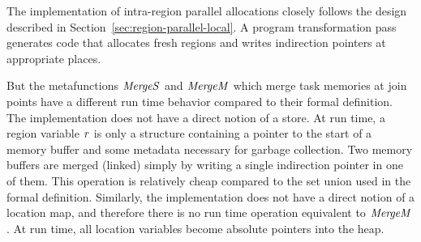 \documentclass[acmsmall,acmthm=false,nonacm]{acmart}
\theoremstyle{straighttext0}
\theoremstyle{straighttext}
\newcommand{\Secref}[1]{Section~\ref{#1}}
\newcommand{\Figref}[1]{Figure~\ref{#1}}
\newcommand{\new}[1]{#1}
\begin{document}
{%

The implementation of intra-region parallel allocations closely follows the
design described in \Secref{sec:region-parallel-local}.
%
A program transformation pass generates code that allocates fresh regions and writes
indirection pointers at appropriate places.
%
\new{
But the metafunctions $\mathit{MergeS}$ and $\mathit{MergeM}$ which merge task memories at join points have
a different run time behavior compared to their formal definition.
%
The implementation does not have a direct notion of a store.
%
At run time, a region variable $\mathit{r}$ is only a structure containing a
pointer to the start of a memory buffer
and some metadata necessary for garbage collection.
%
Two memory buffers are merged (linked) simply by writing a single indirection pointer
in one of them.
%
This operation is relatively cheap compared to the set union used
in the formal definition.
%
Similarly, the implementation does not have a direct notion of a location map,
and therefore there is no run time operation equivalent to $\mathit{MergeM}$.
%
At run time, all location variables become absolute pointers into the heap.
}


}
\end{document}
